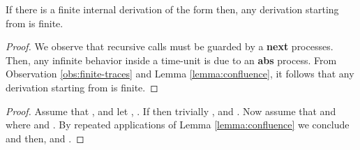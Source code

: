 \documentclass{tlp}
\begin{document}
\begin{lemma}
If there is a finite internal derivation of the form  
then, any derivation starting from  is finite. 
\end{lemma}
\begin{proof}
We observe that
recursive calls must be guarded by a {\bf next} processes. Then, any infinite behavior inside a time-unit is due to an {\bf abs} process. 
From  Observation \ref{obs:finite-traces} and Lemma \ref{lemma:confluence}, it follows that any derivation starting from  is finite. 
\end{proof}

\begin{proof}
Assume that , 
and let , . If  then trivially ,  and . 
Now assume that  and  where  and .  By   repeated applications of Lemma \ref{lemma:confluence}  we conclude  and then,  and . \end{proof}
\end{document}
